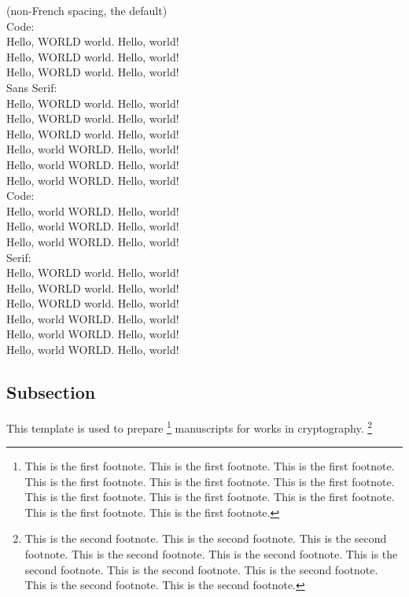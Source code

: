 \nonfrenchspacing
(non-French spacing, the default)\\
{\ttfamily
Code:\\
Hello, WORLD world. Hello, world!\\
Hello, WORLD world\willstop. Hello, world!\\
Hello, WORLD world\wontstop. Hello, world!\\
{\sffamily
Sans Serif:\\
Hello, WORLD world. Hello, world!\\
Hello, WORLD world\willstop. Hello, world!\\
Hello, WORLD world\wontstop. Hello, world!\\
Hello, world WORLD. Hello, world!\\
Hello, world WORLD\willstop. Hello, world!\\
Hello, world WORLD\wontstop. Hello, world!\\
}%
Code:\\
Hello, world WORLD. Hello, world!\\
Hello, world WORLD\willstop. Hello, world!\\
Hello, world WORLD\wontstop. Hello, world!\\
}%
Serif:\\
Hello, WORLD world. Hello, world!\\
Hello, WORLD world\willstop. Hello, world!\\
Hello, WORLD world\wontstop. Hello, world!\\
Hello, world WORLD. Hello, world!\\
Hello, world WORLD\willstop. Hello, world!\\
Hello, world WORLD\wontstop. Hello, world!

\subsection{Subsection}

This template is used to prepare%
\footnote{This is the first footnote.
This is the first footnote.
This is the first footnote.
This is the first footnote.
This is the first footnote.
This is the first footnote.
This is the first footnote.
This is the first footnote.
This is the first footnote.
This is the first footnote.
This is the first footnote.}
manuscripts for works in cryptography.%
\footnote{This is the second footnote.
This is the second footnote.
This is the second footnote.
This is the second footnote.
This is the second footnote.
This is the second footnote.
This is the second footnote.
This is the second footnote.
This is the second footnote.
This is the second footnote.
}

